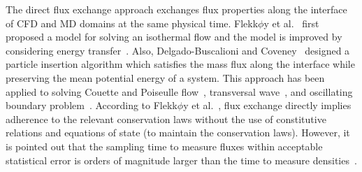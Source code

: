 \documentclass[preprint,12pt]{elsarticle}
\begin{document}
The direct flux exchange approach exchanges flux properties along the interface of CFD and MD domains at the same physical time. Flekk$\phi$y et al.~\cite{Flekkoy} first proposed a model for solving an isothermal flow and the model is improved by considering energy transfer~\cite{Wagner,Delgado1}. Also, Delgado-Buscalioni and Coveney~\cite{USHER} designed a particle insertion algorithm which satisfies the mass flux along the interface while preserving the mean potential energy of a system. This approach has been applied to solving Couette and Poiseulle flow~\cite{Flekkoy}, transversal wave~\cite{Delgado1}, and oscillating boundary problem~\cite{Time_Mechanism}. According to Flekk$\phi$y et al.~\cite{Flekkoy}, flux exchange directly implies adherence to the relevant conservation laws without the use of constitutive relations and equations of state (to maintain the conservation laws). However, it is pointed out that the sampling time to measure fluxes within acceptable statistical error is orders of magnitude larger than the time to measure densities~\cite{Hadjicon3}.



\end{document}
